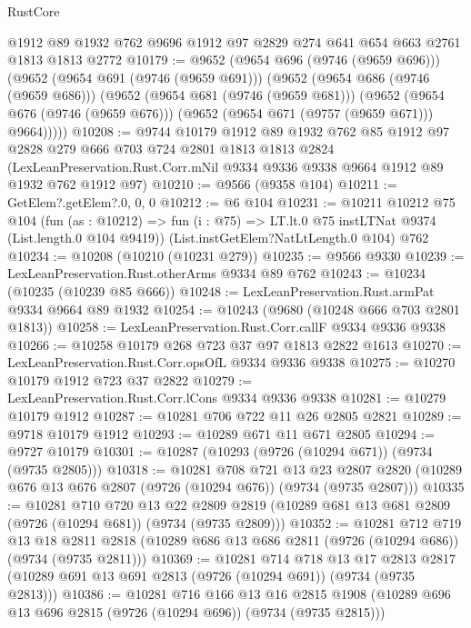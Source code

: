 \begin{lexlean}{RustCore}
\begin{coremodule}
    @1912
    @89
    @1932
    @762
    @9696
    @1912
    @97
    @2829
    @274
    @641
    @654
    @663
    @2761
    @1813
    @1813
    @2772
@10179 := @9652
    (@9654 @696 (@9746 (@9659 @696)))
    (@9652
      (@9654 @691 (@9746 (@9659 @691)))
      (@9652
        (@9654 @686 (@9746 (@9659 @686)))
        (@9652
          (@9654 @681 (@9746 (@9659 @681)))
          (@9652
            (@9654 @676 (@9746 (@9659 @676)))
            (@9652 (@9654 @671 (@9757 (@9659 @671))) @9664)))))
@10208 := @9744
    @10179
    @1912
    @89
    @1932
    @762
    @85
    @1912
    @97
    @2828
    @279
    @666
    @703
    @724
    @2801
    @1813
    @1813
    @2824
    (LexLeanPreservation.Rust.Corr.mNil @9334 @9336 @9338 @9664 @1912 @89 @1932 @762 @1912 @97)
@10210 := @9566 (@9358 @104)
@10211 := GetElem?.getElem?.{0, 0, 0}
@10212 := @6 @104
@10231 := @10211
    @10212
    @75
    @104
    (fun (as : @10212) =>
    fun (i : @75) => LT.lt.{0} @75 instLTNat @9374 (List.length.{0} @104 @9419))
    (List.instGetElem?NatLtLength.{0} @104)
    @762
@10234 := @10208 (@10210 (@10231 @279))
@10235 := @9566 @9330
@10239 := LexLeanPreservation.Rust.otherArms @9334 @89 @762
@10243 := @10234 (@10235 (@10239 @85 @666))
@10248 := LexLeanPreservation.Rust.armPat @9334 @9664 @89 @1932
@10254 := @10243 (@9680 (@10248 @666 @703 @2801 @1813))
@10258 := LexLeanPreservation.Rust.Corr.callF @9334 @9336 @9338
@10266 := @10258 @10179 @268 @723 @37 @97 @1813 @2822 @1613
@10270 := LexLeanPreservation.Rust.Corr.opsOfL @9334 @9336 @9338
@10275 := @10270 @10179 @1912 @723 @37 @2822
@10279 := LexLeanPreservation.Rust.Corr.lCons @9334 @9336 @9338
@10281 := @10279 @10179 @1912
@10287 := @10281 @706 @722 @11 @26 @2805 @2821
@10289 := @9718 @10179 @1912
@10293 := @10289 @671 @11 @671 @2805
@10294 := @9727 @10179
@10301 := @10287 (@10293 (@9726 (@10294 @671)) (@9734 (@9735 @2805)))
@10318 := @10281
    @708
    @721
    @13
    @23
    @2807
    @2820
    (@10289 @676 @13 @676 @2807 (@9726 (@10294 @676)) (@9734 (@9735 @2807)))
@10335 := @10281
    @710
    @720
    @13
    @22
    @2809
    @2819
    (@10289 @681 @13 @681 @2809 (@9726 (@10294 @681)) (@9734 (@9735 @2809)))
@10352 := @10281
    @712
    @719
    @13
    @18
    @2811
    @2818
    (@10289 @686 @13 @686 @2811 (@9726 (@10294 @686)) (@9734 (@9735 @2811)))
@10369 := @10281
    @714
    @718
    @13
    @17
    @2813
    @2817
    (@10289 @691 @13 @691 @2813 (@9726 (@10294 @691)) (@9734 (@9735 @2813)))
@10386 := @10281
    @716
    @166
    @13
    @16
    @2815
    @1908
    (@10289 @696 @13 @696 @2815 (@9726 (@10294 @696)) (@9734 (@9735 @2815)))

\end{coremodule}
\end{lexlean}
